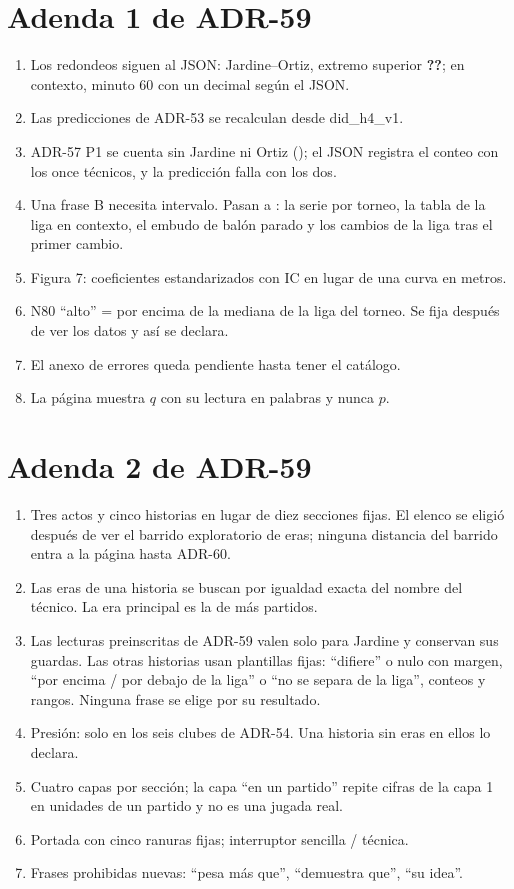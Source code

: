 \documentclass[11pt,a4paper]{article}
\newcommand{\cifraOrtJic}{\textbf{??}}\newcommand{\cifraOrtJq}{\textbf{??}}%
\newcommand{\nivel}[1]{\fbox{\footnotesize\textbf{#1}}}
\newcommand{\fuente}[1]{{\small\ttfamily #1}}
\begin{document}
\section{Adenda 1 de ADR-59}\label{sec:adenda}
\begin{enumerate}
\item Los redondeos siguen al JSON: Jardine--Ortiz, extremo superior
  \cifraOrtJic; en contexto, minuto 60 con un decimal según el JSON.
\item Las predicciones de ADR-53 se recalculan desde \fuente{did\_h4\_v1}.
\item ADR-57 P1 se cuenta sin Jardine ni Ortiz (\cifraViajan); el JSON registra
  el conteo con los once técnicos, y la predicción falla con los dos.
\item Una frase B necesita intervalo. Pasan a \nivel{C}: la serie por torneo,
  la tabla de la liga en contexto, el embudo de balón parado y los cambios de
  la liga tras el primer cambio.
\item Figura 7: coeficientes estandarizados con IC en lugar de una curva en metros.
\item N80 ``alto'' = por encima de la mediana de la liga del torneo. Se fija
  después de ver los datos y así se declara.
\item El anexo de errores queda pendiente hasta tener el catálogo.
\item La página muestra $q$ con su lectura en palabras y nunca $p$.
\end{enumerate}

\section{Adenda 2 de ADR-59}\label{sec:adenda2}
\begin{enumerate}
\item Tres actos y cinco historias en lugar de diez secciones fijas. El elenco
  se eligió después de ver el barrido exploratorio de eras; ninguna distancia
  del barrido entra a la página hasta ADR-60.
\item Las eras de una historia se buscan por igualdad exacta del nombre del
  técnico. La era principal es la de más partidos.
\item Las lecturas preinscritas de ADR-59 valen solo para Jardine y conservan
  sus guardas. Las otras historias usan plantillas fijas: \nivel{A} ``difiere''
  o nulo con margen, \nivel{B} ``por encima / por debajo de la liga'' o ``no se
  separa de la liga'', \nivel{C} conteos y rangos. Ninguna frase se elige por
  su resultado.
\item Presión: solo en los seis clubes de ADR-54. Una historia sin eras en ellos
  lo declara.
\item Cuatro capas por sección; la capa ``en un partido'' repite cifras de la
  capa 1 en unidades de un partido y no es una jugada real.
\item Portada con cinco ranuras fijas; interruptor sencilla / técnica.
\item Frases prohibidas nuevas: ``pesa más que'', ``demuestra que'', ``su idea''.
\end{enumerate}
\end{document}
